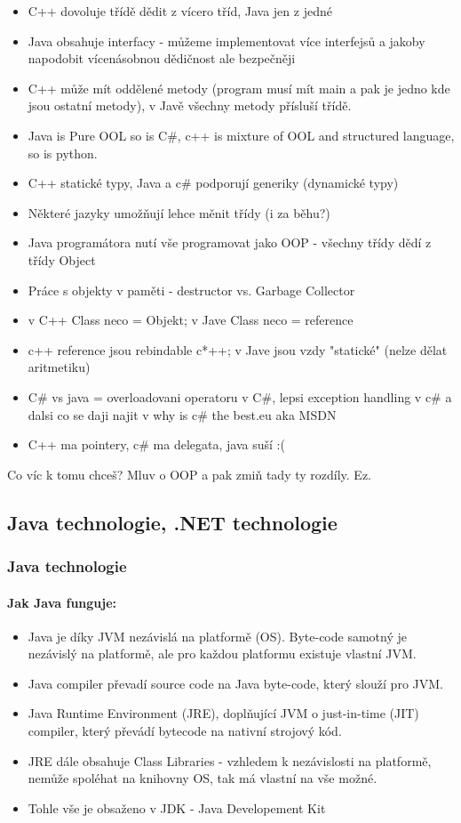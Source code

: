 \documentclass[10pt,a4paper]{article}
\begin{document}
\begin{itemize}
\item C++ dovoluje třídě dědit z vícero tříd, Java jen z jedné
\item Java obsahuje interfacy - můžeme implementovat více interfejsů a jakoby napodobit vícenásobnou dědičnost ale bezpečněji
\item C++ může mít oddělené metody (program musí mít main a pak je jedno kde jsou ostatní metody), v Javě všechny metody přísluší třídě.
\item Java is Pure OOL so is C\#{}, c++ is mixture of OOL and structured language, so is python.
\item C++ statické typy, Java a c\#{} podporují generiky (dynamické typy)
\item Některé jazyky umožňují lehce měnit třídy (i za běhu?)
\item Java programátora nutí vše programovat jako OOP - všechny třídy dědí z třídy Object
\item Práce s objekty v paměti - destructor vs. Garbage Collector
\item v C++ Class neco = Objekt; v Jave Class neco = reference
\item c++ reference jsou rebindable c*++; v Jave jsou vzdy "statické" (nelze dělat aritmetiku)
\item C\#{} vs java = overloadovani operatoru v C\#{}, lepsi exception handling v c\#{} a dalsi co se daji najit v why is c\#{} the best.eu aka MSDN
\item C++ ma pointery, c\#{} ma delegata, java suší :(
\end{itemize}
Co víc k tomu chceš? Mluv o OOP a pak zmiň tady ty rozdíly. Ez.
\subsection{Java technologie, .NET technologie}
\subsubsection{Java technologie}
\paragraph{Jak Java funguje:}
\begin{itemize}
\item Java je díky JVM nezávislá na platformě (OS). Byte-code samotný je nezávislý na platformě, ale pro každou platformu existuje vlastní JVM.
\item Java compiler převadí source code na Java byte-code, který slouží pro JVM.
\item Java Runtime Environment (JRE), doplňující JVM o just-in-time (JIT) compiler, který převádí bytecode na nativní strojový kód.
\item JRE dále obsahuje Class Libraries - vzhledem k nezávislosti na platformě, nemůže spoléhat na knihovny OS, tak má vlastní na vše možné.
\item Tohle vše je obsaženo v JDK - Java Developement Kit
\end{itemize}
\end{document}
